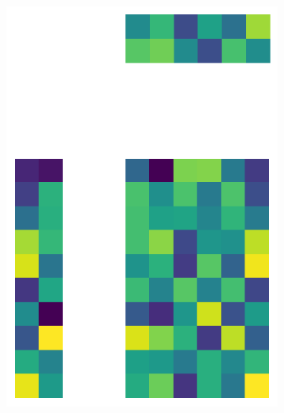 \documentclass[10pt,twocolumn]{article}
\begin{document}
\begin{figure}[H]
\begin{subfigure}[t]{.15\textwidth}
\centering
\includegraphics[scale=.2]{random-matrix-reconstruction-PCs-2.png}
\caption{ }
\end{subfigure}
\begin{subfigure}[t]{.15\textwidth}
\centering

\end{subfigure}
\end{figure}
\end{document}
